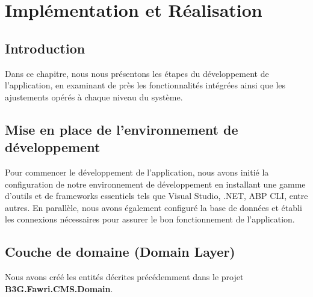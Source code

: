 


\chapter{Implémentation et Réalisation}
\label{chap:Chapter 4 title}
\section*{Introduction}

Dans ce chapitre, nous nous présentons les étapes du développement de l'application, en examinant de près les fonctionnalités intégrées ainsi que les ajustements opérés à chaque niveau du système.



\pagebreak

\section{Mise en place de l'environnement de développement}

\hspace{\parindent}Pour commencer le développement de l'application, nous avons initié la configuration de notre environnement de développement en installant une gamme d'outils et de frameworks essentiels tels que Visual Studio, .NET, ABP CLI, entre autres. En parallèle, nous avons également configuré la base de données et établi les connexions nécessaires pour assurer le bon fonctionnement de l'application.


\section{Couche de domaine (Domain Layer)}

Nous avons créé les entités décrites précédemment dans le projet \textbf{B3G.Fawri.CMS.Domain}.


